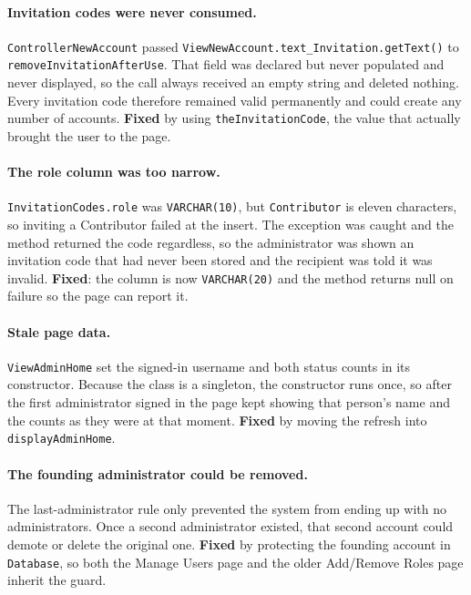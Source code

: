 \documentclass[11pt,a4paper]{article}
\newcommand{\cls}[1]{\texttt{#1}}
\begin{document}
\paragraph{Invitation codes were never consumed.}
\label{iss:invite}
\cls{ControllerNewAccount} passed \cls{ViewNewAccount.text\_Invitation.getText()} to
\cls{removeInvitationAfterUse}. That field was declared but never populated and never
displayed, so the call always received an empty string and deleted nothing. Every invitation
code therefore remained valid permanently and could create any number of accounts.
\textbf{Fixed} by using \cls{theInvitationCode}, the value that actually brought the user to
the page.

\paragraph{The role column was too narrow.}
\label{iss:varchar}
\texttt{InvitationCodes.role} was \texttt{VARCHAR(10)}, but \texttt{Contributor} is eleven
characters, so inviting a Contributor failed at the insert. The exception was caught and the
method returned the code regardless, so the administrator was shown an invitation code that
had never been stored and the recipient was told it was invalid. \textbf{Fixed}: the column
is now \texttt{VARCHAR(20)} and the method returns null on failure so the page can report
it.

\paragraph{Stale page data.}
\label{iss:stale}
\cls{ViewAdminHome} set the signed-in username and both status counts in its constructor.
Because the class is a singleton, the constructor runs once, so after the first
administrator signed in the page kept showing that person's name and the counts as they
were at that moment. \textbf{Fixed} by moving the refresh into \cls{displayAdminHome}.

\paragraph{The founding administrator could be removed.}
\label{iss:founder}
The last-administrator rule only prevented the system from ending up with no administrators.
Once a second administrator existed, that second account could demote or delete the
original one. \textbf{Fixed} by protecting the founding account in \cls{Database}, so both
the Manage Users page and the older Add/Remove Roles page inherit the guard.
\end{document}
